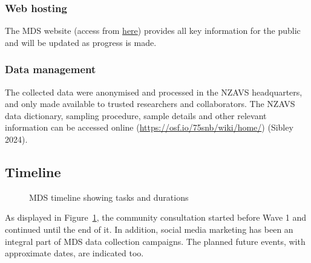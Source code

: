 \documentclass[
]{interact}
\begin{document}
\subsubsection{Web hosting}\label{web-hosting}

The MDS website (access from
\href{https://linktr.ee/muslimdiversity}{here}) provides all key
information for the public and will be updated as progress is made.

\subsubsection{Data management}\label{data-management}

The collected data were anonymised and processed in the NZAVS
headquarters, and only made available to trusted researchers and
collaborators. The NZAVS data dictionary, sampling procedure, sample
details and other relevant information can be accessed online
(\url{https://osf.io/75snb/wiki/home/}) (Sibley 2024).

\subsection{Timeline}\label{timeline}

\begin{figure}


\caption{\label{fig-timeline}MDS timeline showing tasks and durations}

\end{figure}%

As displayed in Figure~\ref{fig-timeline}, the community consultation
started before Wave 1 and continued until the end of it. In addition,
social media marketing has been an integral part of MDS data collection
campaigns. The planned future events, with approximate dates, are
indicated too.
\end{document}
